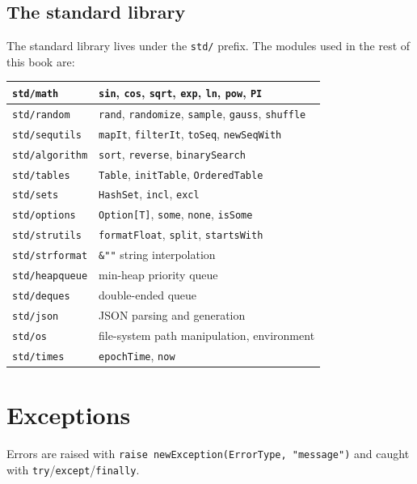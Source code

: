 \documentclass[justified, sixbynine]{tufte-book}
\def\ft{\small\tt}
\theoremstyle{plain}%
\newtheorem * {corollary}{Corollary}
\theoremstyle{definition}
\theoremstyle{remark}
\newtheorem * {remark}{Remark}
\newtheorem * {note}{Note}
\begin{document}
\begin{fullwidth}
\goodbreak\subsection{The standard library}

The standard library lives under the {\ft std/} prefix. The modules used in the rest of this book are:

\begin{tabular}{|l|l|}\hline
{\ft std/math}        & {\ft sin}, {\ft cos}, {\ft sqrt}, {\ft exp}, {\ft ln}, {\ft pow}, {\ft PI} \\ \hline
{\ft std/random}      & {\ft rand}, {\ft randomize}, {\ft sample}, {\ft gauss}, {\ft shuffle} \\ \hline
{\ft std/sequtils}    & {\ft mapIt}, {\ft filterIt}, {\ft toSeq}, {\ft newSeqWith} \\ \hline
{\ft std/algorithm}   & {\ft sort}, {\ft reverse}, {\ft binarySearch} \\ \hline
{\ft std/tables}      & {\ft Table}, {\ft initTable}, {\ft OrderedTable} \\ \hline
{\ft std/sets}        & {\ft HashSet}, {\ft incl}, {\ft excl} \\ \hline
{\ft std/options}     & {\ft Option[T]}, {\ft some}, {\ft none}, {\ft isSome} \\ \hline
{\ft std/strutils}    & {\ft formatFloat}, {\ft split}, {\ft startsWith} \\ \hline
{\ft std/strformat}   & {\ft \&""} string interpolation \\ \hline
{\ft std/heapqueue}   & min-heap priority queue \\ \hline
{\ft std/deques}      & double-ended queue \\ \hline
{\ft std/json}        & JSON parsing and generation \\ \hline
{\ft std/os}          & file-system path manipulation, environment \\ \hline
{\ft std/times}       & {\ft epochTime}, {\ft now} \\ \hline
\end{tabular}

\goodbreak\section{Exceptions}


Errors are raised with {\ft raise newException(ErrorType, "message")} and caught with {\ft try}/{\ft except}/{\ft finally}.


\end{fullwidth}
\end{document}
